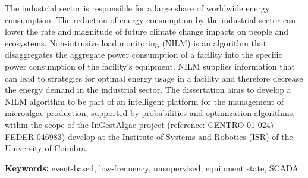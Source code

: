 The industrial sector is responsible for a large share of worldwide energy consumption. The reduction of energy consumption by the industrial sector can lower the rate and magnitude of future climate change impacts on people and ecosystems. Non-intrusive load monitoring (NILM) is an algorithm that disaggregates the aggregate power consumption of a facility into the specific power consumption of the facility's equipment. NILM supplies information that can lead to strategies for optimal energy usage in a facility and therefore decrease the energy demand in the industrial sector. The dissertation aims to develop a NILM algorithm to be part of an intelligent platform for the management of microalgae production, supported by probabilities and optimization algorithms, within the scope of the InGestAlgae project (reference: CENTRO-01-0247-FEDER-046983) develop at the Institute of Systems and Robotics (ISR) of the University of Coimbra.



\textbf{Keywords:} event-based, low-frequency, unsupervised, equipment state, SCADA